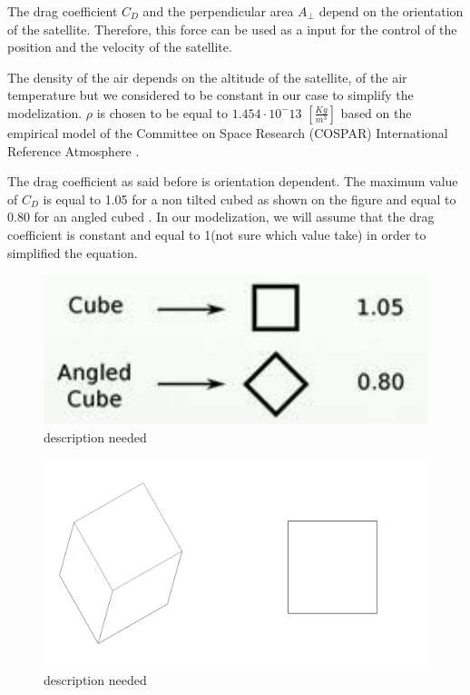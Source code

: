The drag coefficient $C_D$ and the perpendicular area $A_{\perp}$ depend on the orientation of the satellite. Therefore, this force can be used as a input for the control of the position and the velocity of the satellite.

The density of the air depends on the altitude of the satellite, of the air temperature but we considered to be constant in our case to simplify the modelization. $\rho$ is chosen to be equal to $1.454 \cdot 10^-13$ $[\frac{Kg}{m^3}]$ based on the  empirical model of the Committee on Space Research (COSPAR) International Reference Atmosphere \cite{SADC}.

The drag coefficient as said before is orientation dependent. The maximum value of $C_D$ is equal to 1.05 for a non tilted cubed as shown on the figure  and equal to 0.80 for an angled cubed \cite{wik}. In our modelization, we will assume that the drag coefficient is constant and equal to 1(not sure which value take) in order to simplified the equation. 
\begin{table}[H]
	\begin{minipage}[b]{0.49\linewidth}
		\centering
		\begin{figure}[H]
			\centering
			\includegraphics[width=0.8\linewidth]{figures/drag_coef}
			\caption{description needed}
			\label{fig:drag}
		\end{figure}
	\end{minipage}\hfill
	\begin{minipage}[b]{0.49\linewidth}
		\centering
		\begin{figure}[H]
			\centering
			\includegraphics[width=1\linewidth]{figures/a_prep}
			\caption{description needed}
			\label{fig:cub}
		\end{figure}
	\end{minipage}
\end{table}
